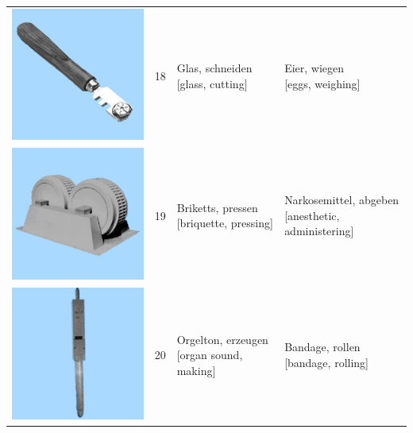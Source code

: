 \documentclass[
  english,
  man,floatsintext]{apa7}
\begin{document}
\begin{center}
\begin{ThreePartTable}
{\begin{longtable}{llll}
\includegraphics[valign=c, scale=0.23]{../materials/unfamiliar/18.png} & 18 & \makecell[l]{Glas, schneiden\\{[glass, cutting]}} & \makecell[l]{Eier, wiegen\\{[eggs, weighing]}}\\
\includegraphics[valign=c, scale=0.23]{../materials/unfamiliar/19.png} & 19 & \makecell[l]{Briketts, pressen\\{[briquette, pressing]}} & \makecell[l]{Narkosemittel, abgeben\\{[anesthetic, administering]}}\\
\includegraphics[valign=c, scale=0.23]{../materials/unfamiliar/20.png} & 20 & \makecell[l]{Orgelton, erzeugen\\{[organ sound, making]}} & \makecell[l]{Bandage, rollen\\{[bandage, rolling]}}\\

\end{longtable}}
\end{ThreePartTable}
\end{center}
\end{document}
